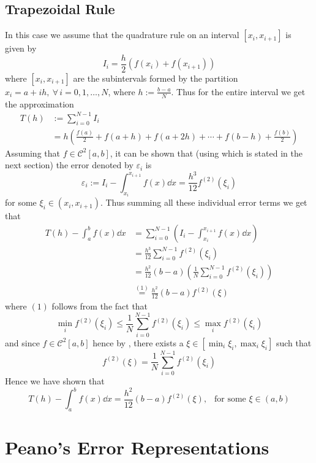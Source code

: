 \subsection{Trapezoidal Rule}

In this case we assume that the quadrature rule on an interval $[x_i, x_{i+1}]$ is given by 
\begin{equation}\label{eq2:apr4A}
    I_i = \frac{h}{2}(f(x_i) + f(x_{i+1}))
\end{equation}
where $[x_i,x_{i+1}]$ are the subintervals formed by the partition $x_i = a + ih, \ \forall \, i = 0,1, \dots, N$, where $h := \frac{b-a}{N}$. Thus for the entire interval we get the approximation 
\begin{align*}
    T(h) &:= \sum_{i=0}^{N-1} I_i \\ 
    &= h\left( \frac{f(a)}{2} + f(a+h) + f(a+2h) + \cdots + f(b-h) + \frac{f(b)}{2}  \right) 
\end{align*}
Assuming that $f \in \mathcal{C}^2[a,b]$, it can be shown that (using  which is stated in the next section) the error denoted by $\varepsilon_i$ is 
\begin{equation}\label{eq3:apr4A}
    \varepsilon_i := I_i - \int_{x_i}^{x_{i+1}} f(x) \dd{x} = \frac{h^3}{12} f^{(2)} (\xi_i) 
\end{equation}
for some $\xi_i \in (x_i, x_{i+1})$. Thus summing all these individual error terms we get that 
\begin{align*}
    T(h) - \int_a^b f(x) \dd{x} 
    &= \sum_{i=0}^{N-1} \left( I_i - \int_{x_i}^{x_{i+1}} f(x) \dd{x} \right) \\ 
    &= \frac{h^3}{12}\sum_{i=0}^{N-1} f^{(2)}(\xi_i) \\ 
    &= \frac{h^2}{12}(b-a) \left( \frac{1}{N} \sum_{i=0}^{N-1} f^{(2)}(\xi_i)\right) \\ 
    &\overset{(1)}{=} \frac{h^2}{12}(b-a) f^{(2)}(\xi)
\end{align*}
where $(1)$ follows from the fact that 
\[
    \min_{i} f^{(2)}(\xi_i) \leq \frac{1}{N} \sum_{i=0}^{N-1} f^{(2)}(\xi_i) \leq \max_{i} f^{(2)}(\xi_i)   
\]
and since $f \in \mathcal{C}^2[a,b]$ hence by , there exists a $\xi \in \left[ \min_i \xi_i, \max_i \xi_i \right]$ such that 
\[
    f^{(2)}(\xi) = \frac{1}{N} \sum_{i=0}^{N-1} f^{(2)}(\xi_i)  
\]
Hence we have shown that 
\begin{equation}\label{eq4:apr4A}
    T(h) - \int_a^b f(x) \dd{x} = \frac{h^2}{12} (b-a) f^{(2)}(\xi), \ \ \mbox{ for some } \xi \in (a,b)
\end{equation}

\section{Peano's Error Representations}